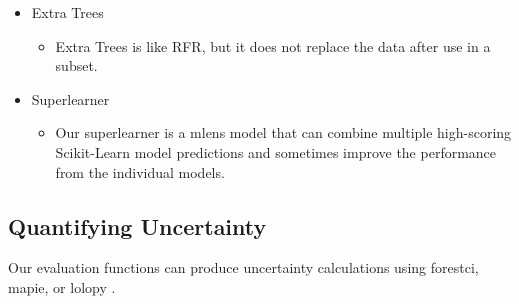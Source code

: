 \documentclass[twocolumn, nofootinbib, secnumarabic, amssymb, nobibnotes, aps, prd]{revtex4-2}
\begin{document}
\begin{itemize}
  \item Extra Trees
  \begin{itemize}
  		\item Extra Trees is like RFR, but it does not replace the data after use in a subset.
  \end{itemize}
  \item Superlearner
  \begin{itemize}
  		\item Our superlearner is a mlens model that can combine multiple high-scoring Scikit-Learn model predictions and sometimes improve the performance from the individual models.
  \end{itemize}
\end{itemize}





\subsection{Quantifying Uncertainty}\label{sec:uncertainty}
Our evaluation functions can produce uncertainty calculations using forestci, mapie, or lolopy \cite{Polimis2017, Taquet2022, Hutchinson2022}. 
\end{document}
